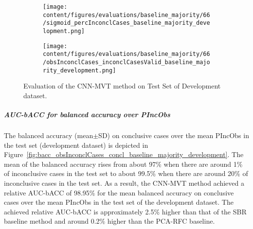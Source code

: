 \begin{figure}[ht]
  \begin{subfigure}{0.48\textwidth}
    \centering
    \texttt{[image: content/figures/evaluations/baseline\_majority/66/sigmoid\_percInconclCases\_baseline\_majority\_development.png]}
    \label{fig:baseline_majority_percInconclCases_development}
  \end{subfigure}
  \hfill
  \begin{subfigure}{0.495\textwidth}
    \centering
    \texttt{[image: content/figures/evaluations/baseline\_majority/66/obsInconclCases\_inconclCasesValid\_baseline\_majority\_development.png]}
    \label{fig:obsInconclCases_inconclCasesValid_baseline_majority_development}
  \end{subfigure}

  \caption{Evaluation of the CNN-MVT method on Test Set of Development dataset.}
  \label{fig:eval_cnn_mvt_dev}
\end{figure}


\subparagraph{AUC-bACC for balanced accuracy over PIncObs}

The balanced accuracy (mean$\pm$SD) on conclusive cases over the mean PIncObs
in the test set (development dataset) 
is depicted in Figure~\ref{fig:bacc_obsInconclCases_concl_baseline_majority_development}.
The mean of the balanced accuracy rises from about 97\% 
when there are around 1\% of inconclusive cases in the test set to about 99.5\% 
when there are around 20\% of inconclusive cases in the test set.
As a result, the CNN-MVT method achieved a relative AUC-bACC of 98.95\% for the mean balanced accuracy on conclusive cases
over the mean PIncObs in the test set of the development dataset.
The achieved relative AUC-bACC is approximately 2.5\% higher than that of the SBR baseline method 
and around 0.2\% higher than the PCA-RFC baseline.


